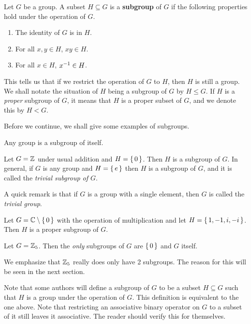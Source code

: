 \documentclass[./main.tex]{subfiles}
\begin{document}
\begin{definition}[Subgroup]
\label{def:subgroup}
    Let $G$ be a group. A subset $H \subseteq G$ is a \textbf{subgroup} of $G$
    if the following properties hold under the operation of $G$.
    \begin{enumerate}
        \item The identity of $G$ is in $H$.
        \item For all $x, y \in H$, $xy \in H$.
        \item For all $x \in H$, $x ^{-1} \in H$.
    \end{enumerate}
\end{definition}
This tells us that if we restrict the operation of $G$ to $H$, then $H$ is still
a group. We shall notate the situation of $H$ being a subgroup of $G$ by $H \leq
G$. If $H$ is a \emph{proper} subgroup of $G$, it means that $H$ is a proper
subset of $G$, and we denote this by $H < G$.

Before we continue, we shall give some examples of subgroups.

\begin{example}
    Any group is a subgroup of itself.
\end{example}

\begin{example}
    Let $G = \mathbb{Z}$ under usual addition and $H = \set{0}$. Then $H$ is a subgroup of
    $G$. In general, if $G$ is any group and $H = \set{e}$ then $H$ is a
    subgroup of $G$, and it is called the \emph{trivial subgroup of $G$}. 
\end{example}
A quick remark is that if $G$ is a group with a single element, then $G$ is
called the \emph{trivial group}.

\begin{example}
    Let $G = \mathbb{C} \setminus \set{0}$ with the operation of multiplication and let
    $H = \set{1, -1, i, -i}$. Then $H$ is a proper subgroup of $G$.
\end{example}

\begin{example}
    Let $G = \mathbb{Z}_5$. Then the \emph{only} subgroups of $G$ are $\set{0}$ and $G$ itself.
\end{example}
We emphasize that $\mathbb{Z}_5$ really does only have 2 subgroups. The reason for this
will be seen in the next section.


Note that some authors will define a subgroup of $G$ to be a subset $H \subseteq
G$ such that $H$ is a group under the operation of $G$. This definition is
equivalent to the one above. Note that restricting an associative binary
operator on $G$ to a subset of it still leaves it associative. The reader should
verify this for themselves.
\end{document}
